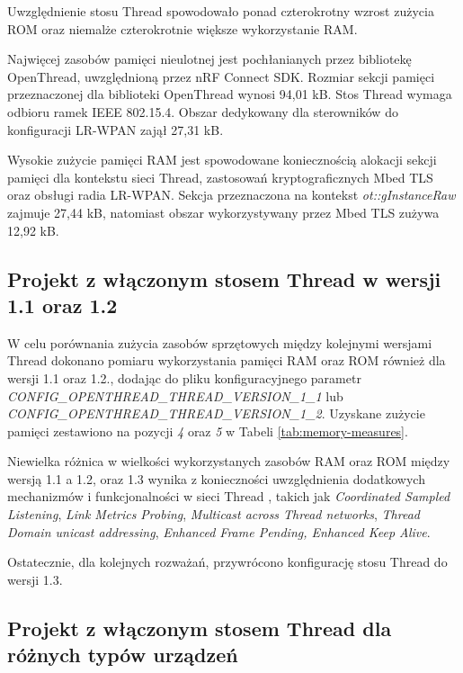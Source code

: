         Uwzględnienie stosu Thread spowodowało ponad czterokrotny wzrost zużycia ROM oraz niemalże czterokrotnie większe wykorzystanie RAM. 
        
        Najwięcej zasobów pamięci nieulotnej jest pochłanianych przez bibliotekę OpenThread, uwzględnioną przez nRF Connect SDK. Rozmiar sekcji pamięci przeznaczonej dla biblioteki OpenThread wynosi 94,01 kB. Stos Thread wymaga odbioru ramek IEEE 802.15.4. Obszar dedykowany dla sterowników do konfiguracji LR-WPAN zajął 27,31 kB.

        Wysokie zużycie pamięci RAM jest spowodowane koniecznością alokacji sekcji pamięci dla kontekstu sieci Thread, zastosowań kryptograficznych Mbed TLS oraz obsługi radia LR-WPAN. Sekcja przeznaczona na kontekst \textit{ot::gInstanceRaw} zajmuje 27,44 kB, natomiast obszar wykorzystywany przez Mbed TLS zużywa 12,92 kB.

    \subsection{Projekt z włączonym stosem Thread w wersji 1.1 oraz 1.2}

    W celu porównania zużycia zasobów sprzętowych między kolejnymi wersjami Thread dokonano pomiaru wykorzystania pamięci RAM oraz ROM również dla wersji 1.1 oraz 1.2., dodając do pliku konfiguracyjnego parametr \textit{CONFIG\_OPENTHREAD\_THREAD\_VERSION\_1\_1} lub \\ \textit{CONFIG\_OPENTHREAD\_THREAD\_VERSION\_1\_2}. Uzyskane zużycie pamięci zestawiono na pozycji \textit{4} oraz \textit{5} w Tabeli \ref{tab:memory-measures}.

    Niewielka różnica w wielkości wykorzystanych zasobów RAM oraz ROM między wersją 1.1 a 1.2, oraz 1.3 wynika z konieczności uwzględnienia dodatkowych mechanizmów i funkcjonalności w sieci Thread \cite{nrf-thread-version-options}, takich jak \textit{Coordinated Sampled Listening}, \textit{Link Metrics Probing}, \textit{Multicast across Thread networks}, \textit{Thread Domain unicast addressing}, \textit{Enhanced Frame Pending, Enhanced Keep Alive}.

    Ostatecznie, dla kolejnych rozważań, przywrócono konfigurację stosu Thread do wersji 1.3.

    \subsection{Projekt z włączonym stosem Thread dla różnych typów urządzeń}

